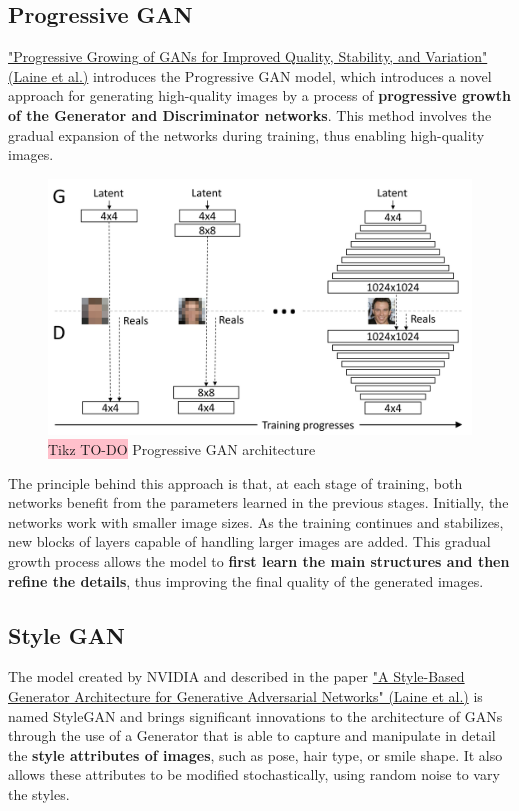 \subsection{Progressive GAN}

\href{https://arxiv.org/pdf/1710.10196}{"Progressive Growing of GANs for Improved Quality, Stability, and Variation" (Laine et al.)} introduces the Progressive GAN model, which introduces a novel approach for generating high-quality images by a process of \textbf{progressive growth of the Generator and Discriminator networks}. This method involves the gradual expansion of the networks during training, thus enabling high-quality images.

\begin{figure}[!htbp]
    \centering
    \includegraphics[width=0.75\linewidth]{tikz/chapter9 - Progressive GAN.png}
    \caption{{\color{red}\colorbox{pink}{Tikz TO-DO}} Progressive GAN architecture}
\end{figure}

The principle behind this approach is that, at each stage of training, both networks benefit from the parameters learned in the previous stages. Initially, the networks work with smaller image sizes. As the training continues and stabilizes, new blocks of layers capable of handling larger images are added. This gradual growth process allows the model to \textbf{first learn the main structures and then refine the details}, thus improving the final quality of the generated images.


\subsection{Style GAN}

The model created by NVIDIA and described in the paper \href{https://arxiv.org/pdf/1812.04948}{"A Style-Based Generator Architecture for Generative Adversarial Networks" (Laine et al.)} is named StyleGAN and brings significant innovations to the architecture of GANs through the use of a Generator that is able to capture and manipulate in detail the \textbf{style attributes of images}, such as pose, hair type, or smile shape. It also allows these attributes to be modified stochastically, using random noise to vary the styles.

